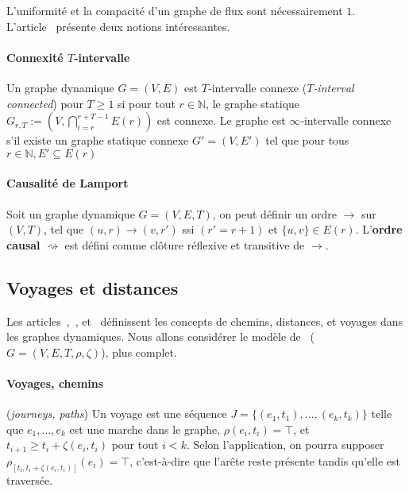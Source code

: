 \documentclass[12pt,a4paper]{article}
\begin{document}
L'uniformité et la compacité d'un graphe de flux sont nécessairement
\(1\).\\

L'article~\cite{kuhn2010distributed} présente deux notions
intéressantes.

\paragraph{Connexité \(T\)‑intervalle}
Un graphe dynamique \(G = (V, E)\) est \(T\)‑intervalle connexe
(\textit{\(T\)‑interval connected}) pour \(T \geq 1\) si pour tout
\(r \in \mathbb{N}\), le graphe statique
\(G_{r,T} := \left(V, \bigcap_{i=r}^{r+T-1} E(r)\right)\) est
connexe. Le graphe est \(\infty\)‑intervalle connexe s'il existe un
graphe statique connexe \(G' = (V, E')\) tel que pour tous
\(r \in \mathbb{N}, E' \subseteq E(r)\)

\paragraph{Causalité de Lamport}
Soit un graphe dynamique \(G = (V, E, T)\), on peut définir un ordre
\(\rightarrow\) sur \((V, T)\), tel que
\((u, r) \rightarrow (v, r')\) ssi \((r' = r + 1)\) et
\(\{u, v\} \in E(r)\). L'\textbf{ordre causal} \(\rightsquigarrow\)
est défini comme clôture réflexive et transitive de \(\rightarrow\).

\subsection{Voyages et distances}

Les articles~\cite{xuan2003computing},~\cite{casteigts2012time},
et~\cite{latapy2017stream} définissent les concepts de chemins,
distances, et voyages dans les graphes dynamiques. Nous allons
considérer le modèle de~\cite{casteigts2012time}
(\(G = (V, E, T, \rho, \zeta)\)), plus complet.

\paragraph{Voyages, chemins} (\textit{journeys, paths}) Un voyage est
une séquence \(J = \{(e_1, t_1), \dots, (e_k, t_k)\}\) telle que
\({e_1, \dots, e_k}\) est une marche dans le graphe,
\(\rho(e_i, t_i) = \top\), et \(t_{i+1} \geq t_i + \zeta(e_i, t_i)\)
pour tout \(i < k\). Selon l'application, on pourra supposer
\(\rho_{[t_i, t_i + \zeta(e_i, t_i)]}(e_i) = \top\), c'est-à-dire que
l'arête reste présente tandis qu'elle est traversée.
\end{document}
